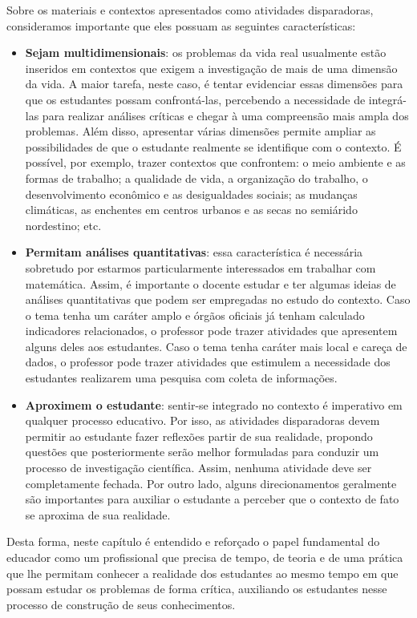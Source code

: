 \begin{paginatexto}
Sobre os materiais e contextos apresentados como atividades disparadoras, consideramos importante que eles possuam as seguintes características:

\begin{itemize}
\item \textbf{Sejam multidimensionais}: os problemas da vida real usualmente estão inseridos em contextos que exigem a investigação de mais de uma dimensão da vida. A maior tarefa, neste caso, é tentar evidenciar essas dimensões para que os estudantes possam confrontá-las, percebendo a necessidade de integrá-las para realizar análises críticas e chegar à uma compreensão mais ampla dos problemas. Além disso, apresentar várias dimensões permite ampliar as possibilidades de que o estudante realmente se identifique com o contexto. É possível, por exemplo, trazer contextos que confrontem: o meio ambiente e as formas de trabalho; a qualidade de vida, a organização do trabalho, o desenvolvimento econômico e as desigualdades sociais; as mudanças climáticas, as enchentes em centros urbanos e as secas no semiárido nordestino;   etc.
\item \textbf{Permitam análises quantitativas}: essa característica é necessária sobretudo por estarmos particularmente interessados em trabalhar com matemática. Assim, é importante o docente estudar e ter algumas ideias de análises quantitativas que podem ser empregadas no estudo do contexto. Caso o tema tenha um caráter amplo e órgãos oficiais já tenham calculado indicadores relacionados, o professor pode trazer atividades que apresentem alguns deles aos estudantes. Caso o tema tenha caráter mais local e careça de dados, o professor pode trazer atividades que estimulem a necessidade dos estudantes realizarem uma pesquisa com coleta de informações.
\item \textbf{Aproximem o estudante}: sentir-se integrado no contexto é imperativo em qualquer processo educativo. Por isso, as atividades disparadoras devem permitir ao estudante fazer reflexões partir de sua realidade, propondo questões que posteriormente serão melhor formuladas para conduzir um processo de investigação científica. Assim, nenhuma atividade deve ser completamente fechada. Por outro lado, alguns direcionamentos geralmente são importantes para auxiliar o estudante a perceber que o contexto de fato se aproxima de sua realidade.
\end{itemize}

Desta forma, neste capítulo é entendido e reforçado o papel fundamental do educador como um profissional que precisa de tempo, de teoria e de uma prática que lhe permitam conhecer a realidade dos estudantes ao mesmo tempo em que possam estudar os problemas de forma crítica, auxiliando os estudantes nesse processo de construção de seus conhecimentos.

\end{paginatexto}

